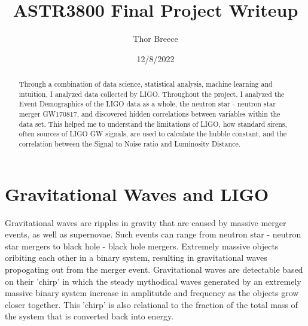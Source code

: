 \documentclass{article}
\title{ASTR3800 Final Project Writeup}
\author{Thor Breece}
\date{12/8/2022} %
\begin{document}
\maketitle

\begin{abstract} 
\noindent  
Through a combination of data science, statistical analysis, machine learning and intuition, I analyzed data collected
by LIGO. Throughout the project, I analyzed the Event Demographics of the LIGO data as a whole, the neutron star - neutron star merger GW170817, and discovered 
hidden correlations between variables within the data set. This helped me to understand the limitations of LIGO, how standard sirens, often sources of LIGO GW signals, 
are used to calculate the hubble constant, and the correlation between the Signal to Noise ratio and Luminosity Distance.
\end{abstract}



\section{Gravitational Waves and LIGO}

\indent

Gravitational waves are ripples in gravity that are caused by massive merger events, as well as supernovae. 
Such events can range from neutron star - neutron star mergers to black hole - black hole mergers. Extremely 
massive objects oribiting each other in a binary system, resulting in gravitational waves propogating out 
from the merger event. Gravitational waves are detectable based on their 'chirp' in which the steady mythodical 
waves generated by an extremely massive binary system increase in amplitutde and frequency as the objects grow 
closer together. This 'chirp' is also relational to the fraction of the total mass of the system that is converted back into energy. \\
\end{document}
